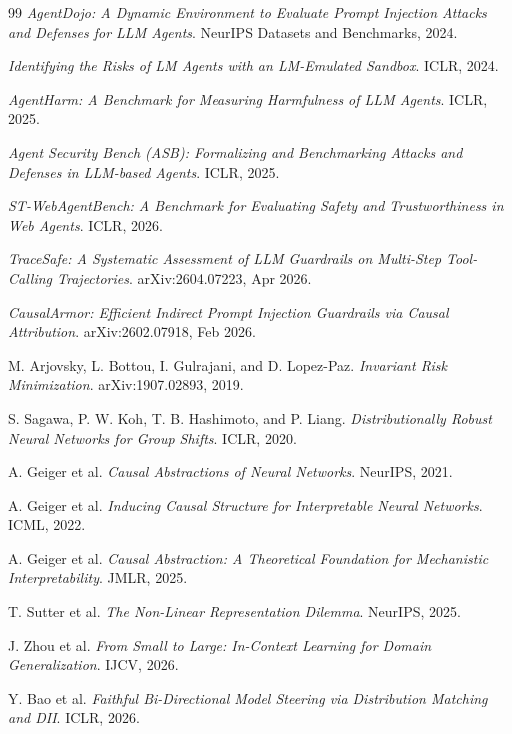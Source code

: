 \documentclass{article}
\begin{document}
\begin{thebibliography}{99}
\textit{AgentDojo: A Dynamic Environment to Evaluate Prompt Injection Attacks and Defenses for LLM Agents}. NeurIPS Datasets and Benchmarks, 2024.

\textit{Identifying the Risks of LM Agents with an LM-Emulated Sandbox}. ICLR, 2024.

\textit{AgentHarm: A Benchmark for Measuring Harmfulness of LLM Agents}. ICLR, 2025.

\textit{Agent Security Bench (ASB): Formalizing and Benchmarking Attacks and Defenses in LLM-based Agents}. ICLR, 2025.

\textit{ST-WebAgentBench: A Benchmark for Evaluating Safety and Trustworthiness in Web Agents}. ICLR, 2026.

\textit{TraceSafe: A Systematic Assessment of LLM Guardrails on Multi-Step Tool-Calling Trajectories}. arXiv:2604.07223, Apr 2026.

\textit{CausalArmor: Efficient Indirect Prompt Injection Guardrails via Causal Attribution}. arXiv:2602.07918, Feb 2026.

M. Arjovsky, L. Bottou, I. Gulrajani, and D. Lopez-Paz. \textit{Invariant Risk Minimization}. arXiv:1907.02893, 2019.

S. Sagawa, P. W. Koh, T. B. Hashimoto, and P. Liang. \textit{Distributionally Robust Neural Networks for Group Shifts}. ICLR, 2020.

A. Geiger et al. \textit{Causal Abstractions of Neural Networks}. NeurIPS, 2021.

A. Geiger et al. \textit{Inducing Causal Structure for Interpretable Neural Networks}. ICML, 2022.

A. Geiger et al. \textit{Causal Abstraction: A Theoretical Foundation for Mechanistic Interpretability}. JMLR, 2025.

T. Sutter et al. \textit{The Non-Linear Representation Dilemma}. NeurIPS, 2025.

J. Zhou et al. \textit{From Small to Large: In-Context Learning for Domain Generalization}. IJCV, 2026.

Y. Bao et al. \textit{Faithful Bi-Directional Model Steering via Distribution Matching and DII}. ICLR, 2026.

\end{thebibliography}
\end{document}
